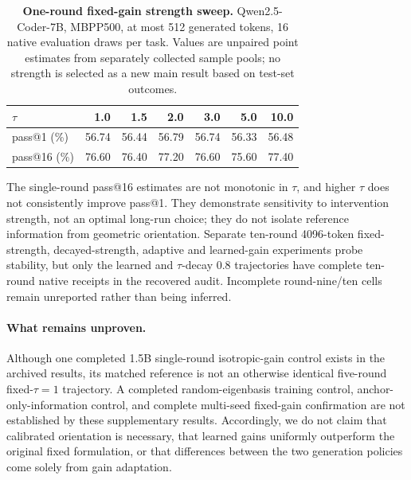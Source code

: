 \begin{table}[h]
\centering\small
\caption{\textbf{One-round fixed-gain strength sweep.}
Qwen2.5-Coder-7B, MBPP500, at most 512 generated tokens,
16 native evaluation draws per task. Values are unpaired
point estimates from separately collected sample pools;
no strength is selected as a new main result based on
test-set outcomes.}
\label{tab:postreview-tau}
\begin{tabular}{lrrrrrr}
\toprule
$\tau$ & 1.0 & 1.5 & 2.0 & 3.0 & 5.0 & 10.0\\
\midrule
pass@1 (\%) & 56.74 & 56.44 & 56.79 & 56.74 & 56.33 & 56.48\\
pass@16 (\%) & 76.60 & 76.40 & 77.20 & 76.60 & 75.60 & 77.40\\
\bottomrule
\end{tabular}
\end{table}

The single-round pass@16 estimates are not monotonic in $\tau$,
and higher $\tau$ does not consistently improve pass@1.
They demonstrate sensitivity to intervention strength, not
an optimal long-run choice; they do not isolate reference
information from geometric orientation. Separate ten-round
4096-token fixed-strength, decayed-strength, adaptive and
learned-gain experiments probe stability, but only the
learned and $\tau$-decay $0.8$ trajectories have complete
ten-round native receipts in the recovered audit.
Incomplete round-nine/ten cells remain unreported rather
than being inferred.

\paragraph{What remains unproven.}
Although one completed 1.5B single-round isotropic-gain
control exists in the archived results, its matched reference
is not an otherwise identical five-round fixed-$\tau=1$
trajectory. A completed random-eigenbasis training control,
anchor-only-information control, and complete multi-seed
fixed-gain confirmation are not established by these
supplementary results. Accordingly, we do not claim that
calibrated orientation is necessary, that learned gains
uniformly outperform the original fixed formulation, or
that differences between the two generation policies
come solely from gain adaptation.
